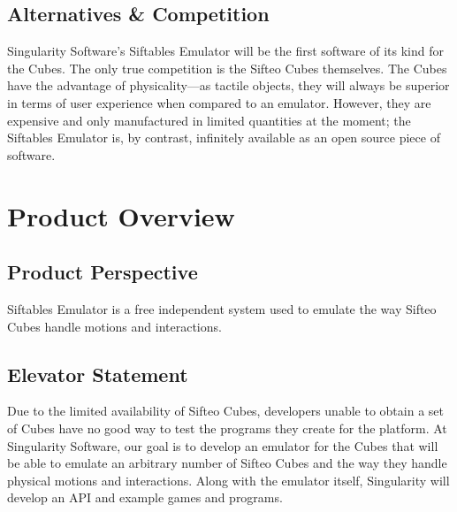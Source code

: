 \documentclass[12pt]{article}
\begin{document}
              \subsection{Alternatives \& Competition}
              Singularity Software's Siftables Emulator will be the first software of its kind for the Cubes. The only true competition is the Sifteo Cubes themselves. The Cubes have the advantage of physicality---as tactile objects, they will always be superior in terms of user experience when compared to an emulator. However, they are expensive and only manufactured in limited quantities at the moment; the Siftables Emulator is, by contrast, infinitely available as an \gls{open source} piece of software.

\section{Product Overview}

              \subsection{Product Perspective}
              Siftables Emulator is a free independent system used to emulate the way Sifteo Cubes handle motions and interactions.

              \subsection{Elevator Statement}
              Due to the limited availability of Sifteo Cubes, developers unable to obtain a set of Cubes have no good way to test the programs they create for the platform. At Singularity Software, our goal is to develop an emulator for the Cubes that will be able to emulate an arbitrary number of Sifteo Cubes and the way they handle physical motions and interactions. Along with the emulator itself, Singularity will develop an \gls{API} and example games and programs.
\clearpage
\end{document}
